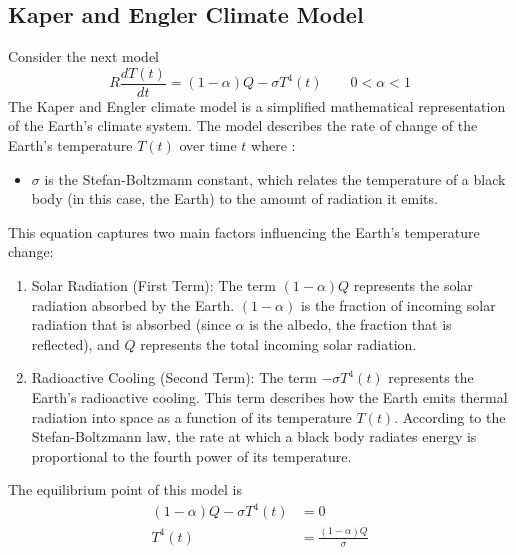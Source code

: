 \subsection{Kaper and Engler Climate Model}
Consider the next model
\[
    R \frac{dT(t)}{dt} = (1-\alpha)Q - \sigma T^4(t) \qquad 0<\alpha <1
\]
The Kaper and Engler climate model is a simplified mathematical representation of the Earth's climate system.
The model describes the rate of change of the Earth's temperature $T(t)$ over time $t$ where :

\begin{itemize}
    \item $\sigma$ is the Stefan-Boltzmann constant, which relates the temperature of a black body (in this case, the Earth) to the amount of radiation it emits.
\end{itemize}
\newpage
This equation captures two main factors influencing the Earth's temperature change:
\begin{enumerate}
    \item Solar Radiation (First Term): The term $(1-\alpha)Q$ represents the solar radiation absorbed by the Earth.
          $(1-\alpha)$ is the fraction of incoming solar radiation that is absorbed (since $\alpha$ is the albedo, the fraction that is reflected),
          and $Q$ represents the total incoming solar radiation.
    \item Radioactive Cooling (Second Term): The term $-\sigma T^4(t)$ represents the Earth's radioactive cooling.
          This term describes how the Earth emits thermal radiation into space as a function of its temperature $T(t)$.
          According to the Stefan-Boltzmann law, the rate at which a black body radiates energy is proportional to the fourth power of its temperature.
\end{enumerate}


The equilibrium point of this model is
\begin{align*}
    (1-\alpha)Q - \sigma T^4(t) & = 0
    \\
    T^4(t)                      & = \frac{(1-\alpha)Q}{\sigma}
\end{align*}

